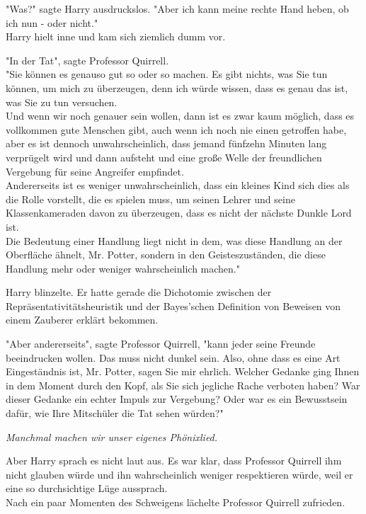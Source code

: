 {"Was?" sagte Harry ausdruckslos. "Aber ich kann meine rechte Hand heben, ob ich nun - oder nicht."\\ Harry hielt inne und kam sich ziemlich dumm vor.

"In der Tat", sagte Professor Quirrell.\\ "Sie können es genauso gut so oder so machen. Es gibt nichts, was Sie tun können, um mich zu überzeugen, denn ich würde wissen, dass es genau das ist, was Sie zu tun versuchen.\\ Und wenn wir noch genauer sein wollen, dann ist es zwar kaum möglich, dass es vollkommen gute Menschen gibt, auch wenn ich noch nie einen getroffen habe, aber es ist dennoch unwahrscheinlich, dass jemand fünfzehn Minuten lang verprügelt wird und dann aufsteht und eine große Welle der freundlichen Vergebung für seine Angreifer empfindet.\\ Andererseits ist es weniger unwahrscheinlich, dass ein kleines Kind sich dies als die Rolle vorstellt, die es spielen muss, um seinen Lehrer und seine Klassenkameraden davon zu überzeugen, dass es nicht der nächste Dunkle Lord ist.\\ Die Bedeutung einer Handlung liegt nicht in dem, was diese Handlung an der Oberfläche ähnelt, Mr. Potter, sondern in den Geisteszuständen, die diese Handlung mehr oder weniger wahrscheinlich machen."

Harry blinzelte. Er hatte gerade die Dichotomie zwischen der Repräsentativitätsheuristik und der Bayes'schen Definition von Beweisen von einem Zauberer erklärt bekommen.

"Aber andererseits", sagte Professor Quirrell, "kann jeder seine Freunde beeindrucken wollen. Das muss nicht dunkel sein. Also, ohne dass es eine Art Eingeständnis ist, Mr. Potter, sagen Sie mir ehrlich. Welcher Gedanke ging Ihnen in dem Moment durch den Kopf, als Sie sich jegliche Rache verboten haben? War dieser Gedanke ein echter Impuls zur Vergebung? Oder war es ein Bewusstsein dafür, wie Ihre Mitschüler die Tat sehen würden?"

\emph{Manchmal machen wir unser eigenes Phönixlied.}

Aber Harry sprach es nicht laut aus. Es war klar, dass Professor Quirrell ihm nicht glauben würde und ihn wahrscheinlich weniger respektieren würde, weil er eine so durchsichtige Lüge aussprach.\\ Nach ein paar Momenten des Schweigens lächelte Professor Quirrell zufrieden.

}
